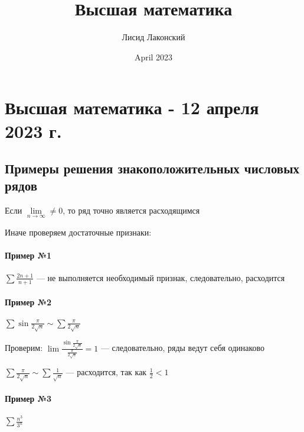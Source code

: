 \documentclass{article}
\title{Высшая математика}
\author{Лисид Лаконский}
\date{April 2023}
\begin{document}
\raggedright

\maketitle

\tableofcontents
\pagebreak

\section{Высшая математика - 12 апреля 2023 г.}

\subsection{Примеры решения знакоположительных числовых рядов}

Если $\lim\limits_{n \to \infty} \ne 0$, то ряд точно является расходящимся

Иначе проверяем достаточные признаки: 
\begin{multienumerate}
\end{multienumerate}

\paragraph{Пример №1}

$\sum \frac{2 n + 1}{n + 1}$ — не выполняется необходимый признак, следовательно, расходится

\paragraph{Пример №2}

$\sum \sin \frac{\pi}{2\sqrt{n}} \sim \sum \frac{\pi}{2\sqrt{n}}$

Проверим: $\lim \frac{\sin \frac{\pi}{2 \sqrt{n}}}{\frac{\pi}{2 \sqrt{n}}} = 1$ — следовательно, ряды ведут себя одинаково

$\sum \frac{\pi}{2\sqrt{n}} \sim \sum \frac{1}{\sqrt{n}}$ — расходится, так как $\frac{1}{2} < 1$

\paragraph{Пример №3}

$\sum \frac{n^3}{3^n}$
\end{document}
